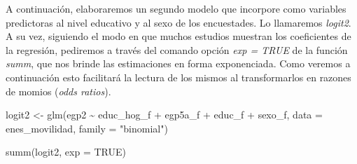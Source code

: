 \documentclass[
]{book}
\newenvironment{Shaded}{\begin{snugshade}}{\end{snugshade}}
\newcommand{\AttributeTok}[1]{\textcolor[rgb]{0.77,0.63,0.00}{#1}}
\newcommand{\ConstantTok}[1]{\textcolor[rgb]{0.00,0.00,0.00}{#1}}
\newcommand{\FunctionTok}[1]{\textcolor[rgb]{0.00,0.00,0.00}{#1}}
\newcommand{\NormalTok}[1]{#1}
\newcommand{\OtherTok}[1]{\textcolor[rgb]{0.56,0.35,0.01}{#1}}
\newcommand{\SpecialCharTok}[1]{\textcolor[rgb]{0.00,0.00,0.00}{#1}}
\newcommand{\StringTok}[1]{\textcolor[rgb]{0.31,0.60,0.02}{#1}}
\begin{document}
A continuación, elaboraremos un segundo modelo que incorpore como variables predictoras al nivel educativo y al sexo de los encuestades. Lo llamaremos \emph{logit2}. A su vez, siguiendo el modo en que muchos estudios muestran los coeficientes de la regresión, pediremos a través del comando opción \emph{exp = TRUE} de la función \emph{summ}, que nos brinde las estimaciones en forma exponenciada. Como veremos a continuación esto facilitará la lectura de los mismos al transformarlos en razones de momios (\emph{odds ratios}).

\begin{Shaded}
\begin{Highlighting}[]
\NormalTok{logit2 }\OtherTok{\textless{}{-}} \FunctionTok{glm}\NormalTok{(egp2 }\SpecialCharTok{\textasciitilde{}}\NormalTok{ educ\_hog\_f }\SpecialCharTok{+}\NormalTok{ egp5a\_f }\SpecialCharTok{+}\NormalTok{ educ\_f }\SpecialCharTok{+}\NormalTok{ sexo\_f, }\AttributeTok{data =}\NormalTok{ enes\_movilidad, }\AttributeTok{family =} \StringTok{"binomial"}\NormalTok{)}

\FunctionTok{summ}\NormalTok{(logit2, }\AttributeTok{exp =} \ConstantTok{TRUE}\NormalTok{)}
\end{Highlighting}
\end{Shaded}
\end{document}
